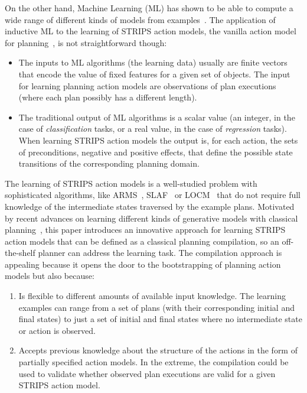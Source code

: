 \documentclass[letterpaper]{article} %
\begin{document}
On the other hand, Machine Learning (ML) has shown to be able to compute a wide range of different kinds of models from examples~\cite{michalski2013machine}. The application of inductive ML to the learning of STRIPS action models, the vanilla action model for planning~\cite{fikes1971strips}, is not straightforward though:
\begin{itemize}
\item The inputs to ML algorithms (the learning data) usually are finite vectors that encode the value of fixed features for a given set of objects. The input for learning planning action models are observations of plan executions (where each plan possibly has a different length).
\item The traditional output of ML algorithms is a scalar value (an integer, in the case of {\em classification} tasks, or a real value, in the case of {\em regression} tasks). When learning STRIPS action models the output is, for each action, the sets of preconditions, negative and positive effects, that define the possible state transitions of the corresponding planning domain.
\end{itemize}

The learning of STRIPS action models is a well-studied problem with sophisticated algorithms, like {\sc ARMS}~\cite{yang2007learning}, {\sc SLAF}~\cite{amir:alearning:JAIR08} or {\sc LOCM}~\cite{cresswell2013acquiring} that do not require full knowledge of the intermediate states traversed by the example plans. Motivated by recent advances on learning different kinds of generative models with classical planning~\cite{bonet2009automatic,segovia2016hierarchical,segovia2017generating}, this paper introduces an innovative approach for learning STRIPS action models that can be defined as a classical planning compilation, so an off-the-shelf planner can address the learning task. The compilation approach is appealing because it opens the door to the bootstrapping of planning action models but also because:
\begin{enumerate}
\item Is flexible to different amounts of available input knowledge. The learning examples can range from a set of plans (with their corresponding initial and final states) to just a set of initial and final states where no intermediate state  or action is observed.
\item Accepts previous knowledge about the structure of the actions in the form of partially specified action models. In the extreme, the compilation could be used to validate whether observed plan executions are valid for a given STRIPS action model.
\end{enumerate}
\end{document}
